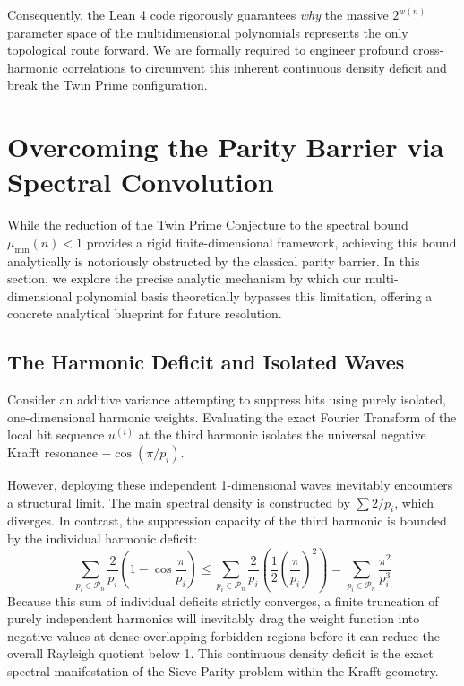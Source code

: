 \documentclass[lean]{AFM}
\renewcommand{\.}{\hskip .75pt}
\begin{document}
Consequently, the Lean 4 code rigorously guarantees \textit{why} the massive $2^{w(n)}$ parameter
space of the multidimensional polynomials represents the only topological route forward. We are
formally required to engineer profound cross-harmonic correlations to circumvent this inherent
continuous density deficit and break the Twin Prime configuration.


\section{Overcoming the Parity Barrier via Spectral Convolution} \label{crossharmonics}

While the reduction of the Twin Prime Conjecture to the spectral bound $\mu_{\min}(n) < 1$ provides
a rigid finite-dimensional framework, achieving this bound analytically is notoriously obstructed
by the classical parity barrier. In this section, we explore the precise analytic mechanism by
which our multi-dimensional polynomial basis theoretically bypasses this limitation, offering a
concrete analytical blueprint for future resolution.

\subsection{The Harmonic Deficit and Isolated Waves}

Consider an additive variance attempting to suppress hits using purely isolated, one-dimensional
harmonic weights. Evaluating the exact Fourier Transform of the local hit sequence $u^{(i)}$ at
the third harmonic isolates the universal negative Krafft resonance $-\cos(\pi/p_i)$. 

However, deploying these independent 1-dimensional waves inevitably encounters a structural limit.
The main spectral density is constructed by $\sum 2/p_i$, which diverges. In contrast, the
suppression capacity of the third harmonic is bounded by the individual harmonic deficit:
$$ \sum_{p_i \in \mathcal{P}_n} \frac{2}{p_i}\left(1 - \cos\frac{\pi}{p_i}\right)
\le \sum_{p_i \in \mathcal{P}_n} \frac{2}{p_i} \left(\frac{1}{2}\left(\frac{\pi}{p_i}\right)^2\right)
 = \sum_{p_i \in \mathcal{P}_n} \frac{\pi^2}{p_i^3} $$
Because this sum of individual deficits strictly converges, a finite truncation of purely
independent harmonics will inevitably drag the weight function into negative values at dense
overlapping forbidden regions before it can reduce the overall Rayleigh quotient below 1. This
continuous density deficit is the exact spectral manifestation of the Sieve Parity problem within
the Krafft geometry.
\end{document}

